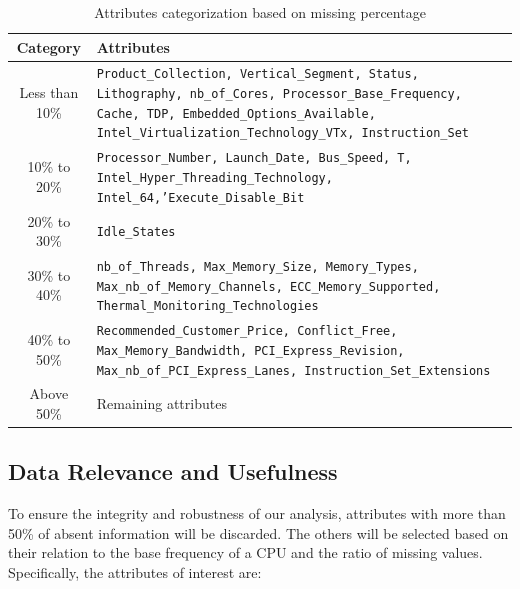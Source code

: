 \begin{table}[H]
    \centering
    \begin{tabular}{|c|p{12cm}|}
        \hline
        \textbf{Category} & \textbf{Attributes} \\ \hline
        Less than 10\% & \texttt{Product\_Collection, Vertical\_Segment, Status, Lithography, nb\_of\_Cores, Processor\_Base\_Frequency, Cache, TDP, Embedded\_Options\_Available, Intel\_Virtualization\_Technology\_VTx, Instruction\_Set}\\ \hline

        10\% to 20\% & \texttt{Processor\_Number, Launch\_Date, Bus\_Speed, T, Intel\_Hyper\_Threading\_Technology, Intel\_64,'Execute\_Disable\_Bit} \\ \hline

        20\% to 30\% & \texttt{Idle\_States} \\ \hline

        30\% to 40\% & \texttt{nb\_of\_Threads, Max\_Memory\_Size, Memory\_Types, Max\_nb\_of\_Memory\_Channels, ECC\_Memory\_Supported, Thermal\_Monitoring\_Technologies} \\ \hline

        40\% to 50\% & \texttt{Recommended\_Customer\_Price, Conflict\_Free, Max\_Memory\_Bandwidth, PCI\_Express\_Revision, Max\_nb\_of\_PCI\_Express\_Lanes, Instruction\_Set\_Extensions} \\ \hline

        Above 50\% & Remaining attributes \\ \hline
    \end{tabular}
    \caption{Attributes categorization based on missing percentage}
\end{table}

\subsection{Data Relevance and Usefulness}
To ensure the integrity and robustness of our analysis, attributes with more than 50\% of absent information will be discarded. The others will be selected based on their relation to the base frequency of a CPU and the ratio of missing values. Specifically, the attributes of interest are:

